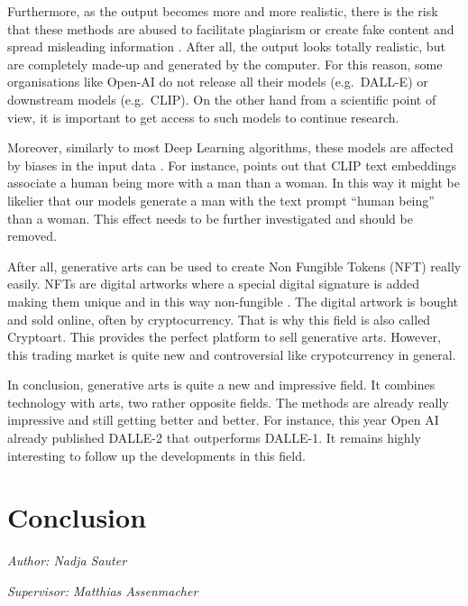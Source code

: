 \documentclass[
]{krantz}
\begin{document}
Furthermore, as the output becomes more and more realistic, there is the risk that these methods are abused to facilitate plagiarism or create fake content and spread misleading information \citep{misconduct}. After all, the output looks totally realistic, but are completely made-up and generated by the computer. For this reason, some organisations like Open-AI do not release all their models (e.g.~DALL-E) or downstream models (e.g.~CLIP). On the other hand from a scientific point of view, it is important to get access to such models to continue research.

Moreover, similarly to most Deep Learning algorithms, these models are affected by biases in the input data \citep{bias_ML}. For instance, \citet{bias} points out that CLIP text embeddings associate a human being more with a man than a woman. In this way it might be likelier that our models generate a man with the text prompt ``human being'' than a woman. This effect needs to be further investigated and should be removed.

After all, generative arts can be used to create Non Fungible Tokens (NFT) really easily. NFTs are digital artworks where a special digital signature is added making them unique and in this way non-fungible \citep{NFT}. The digital artwork is bought and sold online, often by cryptocurrency. That is why this field is also called Cryptoart. This provides the perfect platform to sell generative arts. However, this trading market is quite new and controversial like crypotcurrency in general.

In conclusion, generative arts is quite a new and impressive field. It combines technology with arts, two rather opposite fields. The methods are already really impressive and still getting better and better. For instance, this year Open AI already published DALLE-2 \citep{DALLE2} that outperforms DALLE-1. It remains highly interesting to follow up the developments in this field.

\hypertarget{conclusion-1}{%
\chapter{Conclusion}\label{conclusion-1}}

\emph{Author: Nadja Sauter}

\emph{Supervisor: Matthias Assenmacher}
\end{document}
